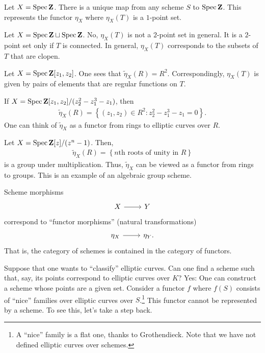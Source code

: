 \documentclass [11 pt, oneside] {article}
\begin{document}
\begin{example}[ ]\label{}\text{}
Let $X=\operatorname{Spec} \mathbf{Z}$. There is a unique map from any scheme $S$ to $\operatorname{Spec} \mathbf{Z}$. This represents the functor $\eta_X$ where $\eta_X(T)$ is a $1$-point set.
\end{example}

\begin{example}[ ]\label{}\text{}
Let $X = \operatorname{Spec} \mathbf{Z}\sqcup \operatorname{Spec} \mathbf{Z}$. No, $\eta_X(T)$ is not a $2$-point set in general. It is a $2$-point set only if $T$ is connected. In general, $\eta_X(T)$ corresponds to the subsets of $T$ that are clopen.
\end{example}

\begin{example}[ ]\label{}\text{}
Let $X=\operatorname{Spec} \mathbf{Z}[z_1,z_2]$. One sees that $\tilde \eta_X(R) = R^2$. Correspondingly, $\eta_X(T)$ is given by pairs of elements that are regular functions on $T$.

If $X = \operatorname{Spec} \mathbf{Z}[z_1,z_2]/(z_2^2-z_1^3-z_1)$, then
\begin{align*}
	\tilde \eta_X(R) =  \left\{ (z_1,z_2)\in R^2 :  z_2^2-z_1^3-z_1=0\right\}.
\end{align*}
One can think of $\tilde\eta_X$ as a functor from rings to elliptic curves over $R$.
\end{example}

\begin{example}[ ]\label{}\text{}
Let $X=\operatorname{Spec} \mathbf{Z}[z] / (z^n-1)$. Then, 
 \begin{align*}
	\tilde \eta_X(R) =  \left\{ \textrm{$n$th roots of unity in $R$}\right\} 
\end{align*}
is a group under multiplication. Thus, $\tilde\eta_X$ can be viewed as a functor from rings to groups. This is an example of an algebraic group scheme.
\end{example}

\begin{remark}
	Scheme morphisms 
	\[
\begin{tikzcd}
X\ar[r]&Y
\end{tikzcd}
\]
 correspond to ``functor morphisms'' (natural transformations) 
 \[
\begin{tikzcd}
\eta_X\ar[r]&\eta_Y.
\end{tikzcd}
\] 
That is, the category of schemes is contained in the category of functors.
\end{remark}

Suppose that one wants to ``classify'' elliptic curves. Can one find a scheme such that, say, its points correspond to elliptic curves over $K$? Yes: One can construct a scheme whose points are a given set. Consider a functor $f$ where $f(S)$ consists of ``nice'' families over elliptic curves over $S$.\footnote{A ``nice'' family is a flat one, thanks to Grothendieck. Note that we have not defined elliptic curves over schemes.} This functor cannot be represented by a scheme. To see this, let's take a step back.
\end{document}
